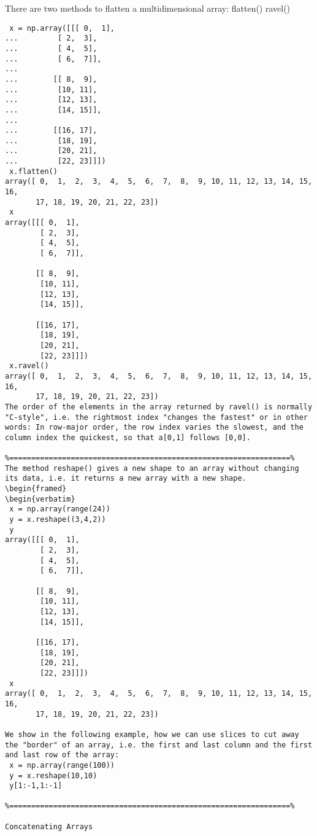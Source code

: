 There are two methods to flatten a multidimensional array:
flatten()
ravel()
\begin{framed}
\begin{verbatim}
 x = np.array([[[ 0,  1],
...         [ 2,  3],
...         [ 4,  5],
...         [ 6,  7]],
... 
...        [[ 8,  9],
...         [10, 11],
...         [12, 13],
...         [14, 15]],
... 
...        [[16, 17],
...         [18, 19],
...         [20, 21],
...         [22, 23]]])
 x.flatten()
array([ 0,  1,  2,  3,  4,  5,  6,  7,  8,  9, 10, 11, 12, 13, 14, 15, 16,
       17, 18, 19, 20, 21, 22, 23])
 x
array([[[ 0,  1],
        [ 2,  3],
        [ 4,  5],
        [ 6,  7]],

       [[ 8,  9],
        [10, 11],
        [12, 13],
        [14, 15]],

       [[16, 17],
        [18, 19],
        [20, 21],
        [22, 23]]])
 x.ravel()
array([ 0,  1,  2,  3,  4,  5,  6,  7,  8,  9, 10, 11, 12, 13, 14, 15, 16,
       17, 18, 19, 20, 21, 22, 23])
The order of the elements in the array returned by ravel() is normally "C-style", i.e. the rightmost index "changes the fastest" or in other words: In row-major order, the row index varies the slowest, and the column index the quickest, so that a[0,1] follows [0,0]. 

%================================================================%
The method reshape() gives a new shape to an array without changing its data, i.e. it returns a new array with a new shape.
\begin{framed}
\begin{verbatim}
 x = np.array(range(24))
 y = x.reshape((3,4,2))
 y
array([[[ 0,  1],
        [ 2,  3],
        [ 4,  5],
        [ 6,  7]],

       [[ 8,  9],
        [10, 11],
        [12, 13],
        [14, 15]],

       [[16, 17],
        [18, 19],
        [20, 21],
        [22, 23]]])
 x
array([ 0,  1,  2,  3,  4,  5,  6,  7,  8,  9, 10, 11, 12, 13, 14, 15, 16,
       17, 18, 19, 20, 21, 22, 23])
 
We show in the following example, how we can use slices to cut away the "border" of an array, i.e. the first and last column and the first and last row of the array:
 x = np.array(range(100))
 y = x.reshape(10,10)
 y[1:-1,1:-1]

%================================================================%

Concatenating Arrays


\end{verbatim}
\end{framed}
